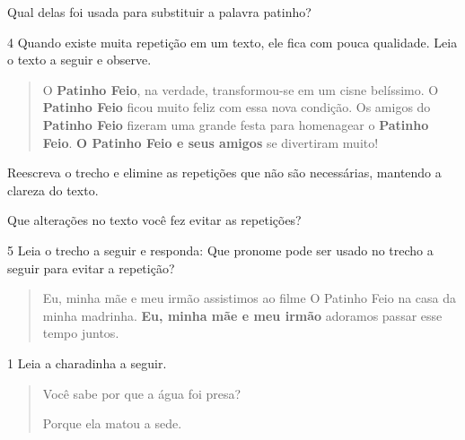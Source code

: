 \begin{escolha}
\begin{escolha}


\item Qual delas foi usada para substituir a palavra patinho?

\end{escolha}


\num{4} Quando existe muita repetição em um texto, ele fica com pouca qualidade.
Leia o texto a seguir e observe.

\begin{quote}
O \textbf{Patinho Feio}, na verdade, transformou-se em um cisne
belíssimo. O \textbf{Patinho Feio} ficou muito feliz com essa nova
condição. Os amigos do \textbf{Patinho Feio} fizeram uma grande festa
para homenagear o \textbf{Patinho Feio}. \textbf{O Patinho Feio e seus
amigos} se divertiram muito!
\end{quote}

\begin{escolha}
\item Reescreva o trecho e elimine as repetições que não são necessárias,
mantendo a clareza do texto.


\item Que alterações no texto você fez evitar as repetições?

\end{escolha}

\num{5} Leia o trecho a seguir e responda: Que pronome pode ser usado no trecho
a seguir para evitar a repetição?

\begin{quote}
Eu, minha mãe e meu irmão assistimos ao filme O Patinho Feio na casa da
minha madrinha. \textbf{Eu, minha mãe e meu irmão} adoramos passar esse
tempo juntos.
\end{quote}



\num{1} Leia a charadinha a seguir.

\begin{quote}
Você sabe por que a água foi presa?

Porque ela matou a sede.
\end{quote}


\end{escolha}
